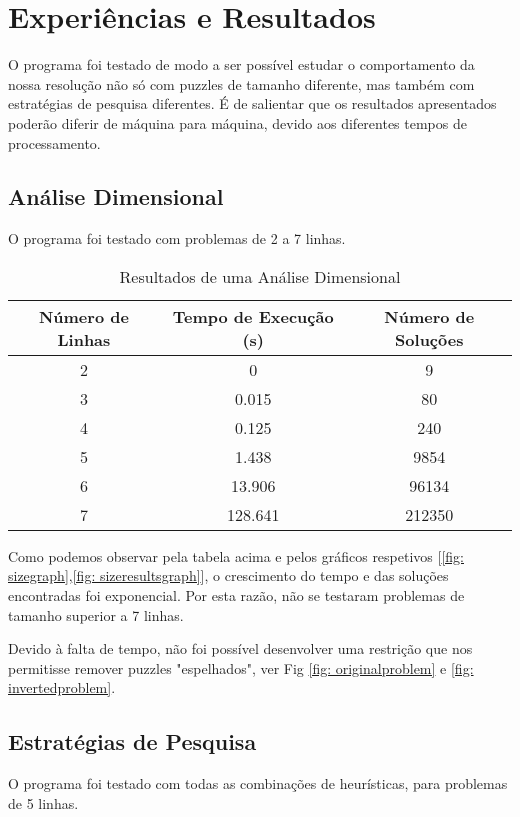 \section{Experiências e Resultados}
O programa foi testado de modo a ser possível estudar o comportamento da nossa resolução não só com puzzles de tamanho diferente, mas também com estratégias de pesquisa diferentes.
É de salientar que os resultados apresentados poderão diferir de máquina para máquina, devido aos diferentes tempos de processamento.

\subsection{Análise Dimensional}
O programa foi testado com problemas de 2 a 7 linhas.

\begin{table}[h!]
\centering
\begin{tabular}{|c|c|c|} 
 \hline
 Número de Linhas & Tempo de Execução (s) & Número de Soluções \\ [0.5ex] 
 \hline
 2 & 0 & 9  \\
 3 & 0.015 & 80 \\
 4 & 0.125 & 240 \\
 5 & 1.438 & 9854 \\
 6 & 13.906 & 96134 \\
 7 & 128.641 & 212350 \\ [1ex] 
 \hline
\end{tabular}
\caption{Resultados de uma Análise Dimensional}
\label{table: dimensional_analisys}
\end{table}

Como podemos observar pela tabela acima e pelos gráficos respetivos [\ref{fig: sizegraph},\ref{fig: sizeresultsgraph}], o crescimento do tempo e das soluções encontradas foi exponencial. Por esta razão, não se testaram problemas de tamanho superior a 7 linhas.

Devido à falta de tempo, não foi possível desenvolver uma restrição que nos permitisse remover puzzles "espelhados", ver Fig \ref{fig: originalproblem} e \ref{fig: invertedproblem}.


\subsection{Estratégias de Pesquisa}
O programa foi testado com todas as combinações de heurísticas, para problemas de 5 linhas.

